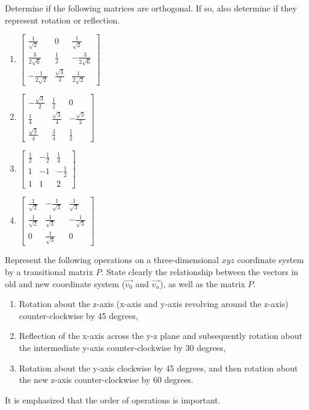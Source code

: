 \begin{Exercise}
Determine if the following matrices are orthogonal. If so, also determine if they represent rotation or reflection.
\begin{enumerate}[label=(\alph*)]
\item $\begin{bmatrix}
\frac{1}{\sqrt{2}} & 0 & \frac{1}{\sqrt{2}}\\
\frac{3}{2\sqrt{6}} & \frac{1}{2} & -\frac{3}{2\sqrt{6}}\\
-\frac{1}{2\sqrt{2}} & \frac{\sqrt{3}}{2} & \frac{1}{2\sqrt{2}}
\end{bmatrix}$
\item $\begin{bmatrix}
-\frac{\sqrt{3}}{2} & \frac{1}{2} & 0\\
\frac{1}{4} & \frac{\sqrt{3}}{4} & -\frac{\sqrt{3}}{2}\\
\frac{\sqrt{3}}{4} & \frac{3}{4} & \frac{1}{2}
\end{bmatrix}$
\item $\begin{bmatrix}
\frac{1}{2}&-\frac{1}{2}&\frac{1}{4}\\
1&-1&-\frac{1}{2}\\ 
1&1&2 \end{bmatrix}$
\item $\begin{bmatrix}
\frac{1}{\sqrt{2}} & -\frac{1}{\sqrt{3}} & \frac{1}{\sqrt{3}}\\
\frac{1}{\sqrt{2}} & \frac{1}{\sqrt{3}} & -\frac{1}{\sqrt{3}}\\
0 & \frac{1}{\sqrt{3}} & 0
\end{bmatrix}$
\end{enumerate}
\end{Exercise}

\begin{Exercise}
Represent the following operations on a three-dimensional $xyz$ coordinate system by a transitional matrix $P$. State clearly the relationship between the vectors in old and new coordinate system ($\vec{v_0}$ and $\vec{v_n}$), as well as the matrix $P$.
\begin{enumerate}[label=(\alph*)]
\item Rotation about the z-axis (x-axis and y-axis revolving around the z-axis) counter-clockwise by 45 degrees,
\item Reflection of the x-axis across the y-z plane and subsequently rotation about the intermediate y-axis counter-clockwise by 30 degrees,
\item Rotation about the y-axis clockwise by 45 degrees, and then rotation about the new z-axis counter-clockwise by 60 degrees.
\end{enumerate}
It is emphasized that the order of operations is important.
\end{Exercise}

